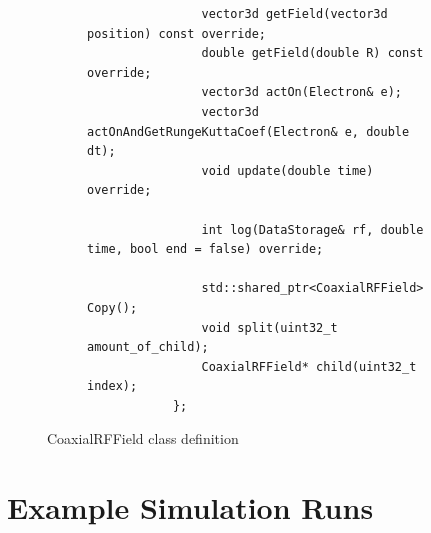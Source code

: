 \documentclass[a4paper,oneside,12pt]{report}
\numberwithin{equation}{chapter}
\begin{document}
\begin{figure}[H]
\begin{subfigure}{\textwidth}
\begin{verbatim}
                vector3d getField(vector3d position) const override;
                double getField(double R) const override;
                vector3d actOn(Electron& e);
                vector3d actOnAndGetRungeKuttaCoef(Electron& e, double dt);    
                void update(double time) override; 

                int log(DataStorage& rf, double time, bool end = false) override;

                std::shared_ptr<CoaxialRFField> Copy();
                void split(uint32_t amount_of_child);
                CoaxialRFField* child(uint32_t index);
            };
        \end{verbatim}
    \end{subfigure}
    \caption{CoaxialRFField class definition}
    \label{fig:rf_class}
\end{figure}

\chapter{Example Simulation Runs} \label{appendix:example_simulation_runs}
\end{document}
